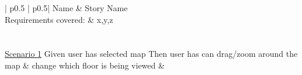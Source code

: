 \begin{longtable}{| p{} | p{}|}
	\hline
	Name & Story Name\\\hline
	Requirements covered: & x,y,z\\\hline
	\\\hline
	\\\hline
	\underline{Scenario 1}\newline
	Given user has selected map \newline 
	Then user has can drag/zoom around the map \& change which floor is being viewed \newline
	&
	\\\hline
\end{longtable}
